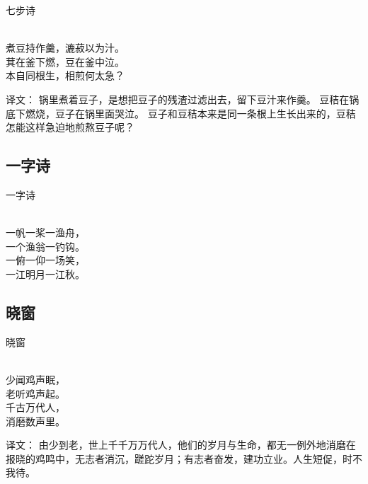 \noindent 七步诗

  \\

\noindent 煮豆持作羹，漉菽以为汁。\\
萁在釜下燃，豆在釜中泣。\\
本自同根生，相煎何太急？

译文：
锅里煮着豆子，是想把豆子的残渣过滤出去，留下豆汁来作羹。
豆秸在锅底下燃烧，豆子在锅里面哭泣。
豆子和豆秸本来是同一条根上生长出来的，豆秸怎能这样急迫地煎熬豆子呢？

\subsection{一字诗}

\noindent 一字诗

  \\

\noindent 一帆一桨一渔舟，\\
一个渔翁一钓钩。\\
一俯一仰一场笑，\\
一江明月一江秋。

\subsection{晓窗}

\noindent 晓窗

  \\

\noindent 少闻鸡声眠，\\老听鸡声起。\\
千古万代人，\\消磨数声里。

译文：
由少到老，世上千千万万代人，他们的岁月与生命，都无一例外地消磨在报晓的鸡鸣中，无志者消沉，蹉跎岁月；有志者奋发，建功立业。人生短促，时不我待。